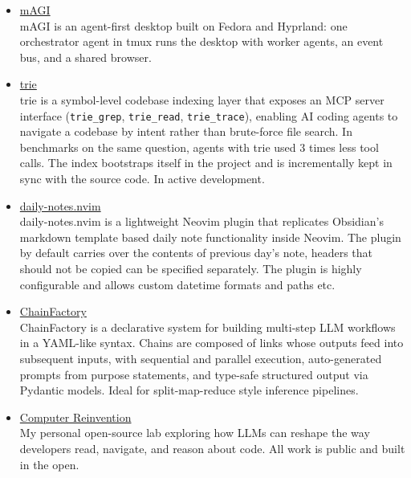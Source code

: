 \begin{itemize}
    \item \href{https://computerreinvention.com/magi/}{mAGI} \\
    mAGI is an agent-first desktop built on Fedora and Hyprland: one orchestrator agent in tmux runs the desktop with worker agents, an event bus, and a shared browser.
    \item \href{https://computerreinvention.com/trie/}{trie} \\
    trie is a symbol-level codebase indexing layer that exposes an MCP server interface (\texttt{trie\_grep}, \texttt{trie\_read}, \texttt{trie\_trace}), enabling AI coding agents to navigate a codebase by intent rather than brute-force file search. In benchmarks on the same question, agents with trie used 3 times less tool calls. The index bootstraps itself in the project and is incrementally kept in sync with the source code. In active development.
    \item \href{https://github.com/pankajgarkoti/daily-notes.nvim}{daily-notes.nvim} \\
    daily-notes.nvim is a lightweight Neovim plugin that replicates Obsidian's markdown template based daily note functionality inside Neovim. The plugin by default carries over the contents of previous day's note, headers that should not be copied can be specified separately. The plugin is highly configurable and allows custom datetime formats and paths etc.
    \item \href{https://computerreinvention.com/chainfactory/}{ChainFactory} \\
    ChainFactory is a declarative system for building multi-step LLM workflows in a YAML-like syntax. Chains are composed of links whose outputs feed into subsequent inputs, with sequential and parallel execution, auto-generated prompts from purpose statements, and type-safe structured output via Pydantic models. Ideal for split-map-reduce style inference pipelines.
    \item \href{https://computerreinvention.com/}{Computer Reinvention} \\
    My personal open-source lab exploring how LLMs can reshape the way developers read, navigate, and reason about code. All work is public and built in the open.
\end{itemize}
